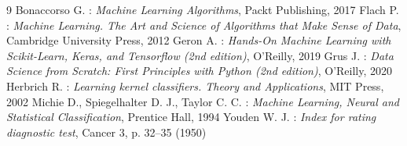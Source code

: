 \documentclass[10pt]{article}
\begin{document}
\begin{thebibliography}{9}
	 Bonaccorso G. : \textit{Machine Learning Algorithms}, Packt Publishing, 2017
		Flach P. : \textit{Machine Learning. The Art and Science of Algorithms that Make Sense of Data}, Cambridge University Press, 2012
		Geron A. : \textit{Hands-On Machine Learning with Scikit-Learn, Keras, and Tensorflow (2nd edition)}, O'Reilly, 2019 
		Grus J. : \textit{Data Science from Scratch: First Principles with Python (2nd edition)}, O'Reilly, 2020
		Herbrich R. : \textit{Learning kernel classifiers. Theory and Applications}, MIT Press, 2002 
		Michie D., Spiegelhalter D. J., Taylor C. C. : \textit{Machine Learning, Neural and Statistical Classification}, Prentice Hall, 1994
		Youden W. J. : \textit{Index for rating diagnostic test}, Cancer 3, p. 32--35 (1950)
\end{thebibliography}
\end{document}

